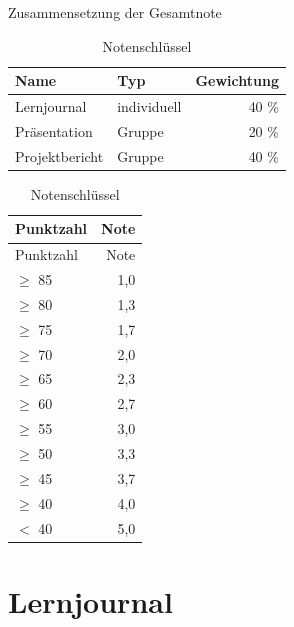\documentclass[DIV=15,headinclude=true]{scrreprt}
\begin{document}
\begin{table}[!b]
	\begin{minipage}{.5\linewidth}
		\caption{Zusammensetzung der Gesamtnote}
		\begin{center}
			\label{tab:zusammensetzung}
			\begin{tabular}{llr}
				\toprule
				Name           & Typ         & Gewichtung \\
				\midrule
				Lernjournal    & individuell & 40 \%      \\
				Präsentation   & Gruppe      & 20 \%      \\
				Projektbericht & Gruppe      & 40 \%      \\
				\bottomrule
			\end{tabular}

		\end{center}
	\end{minipage}%
	\begin{minipage}{.5\linewidth}
		\caption{Notenschlüssel}
		\label{tab:notenschluessel}
		\begin{center}
			\begin{tabular}{lr}
				\toprule
				Punktzahl   & Note \\
				\midrule
				Punktzahl   & Note \\
				\(\geq\) 85 & 1,0  \\
				\(\geq\) 80 & 1,3  \\
				\(\geq\) 75 & 1,7  \\
				\(\geq\) 70 & 2,0  \\
				\(\geq\) 65 & 2,3  \\
				\(\geq\) 60 & 2,7  \\
				\(\geq\) 55 & 3,0  \\
				\(\geq\) 50 & 3,3  \\
				\(\geq\) 45 & 3,7  \\
				\(\geq\) 40 & 4,0  \\
				\(<\) 40    & 5,0  \\
				\bottomrule
			\end{tabular}
		\end{center}

	\end{minipage}
\end{table}







\chapter{Lernjournal}
\label{lernjournal}
\end{document}
